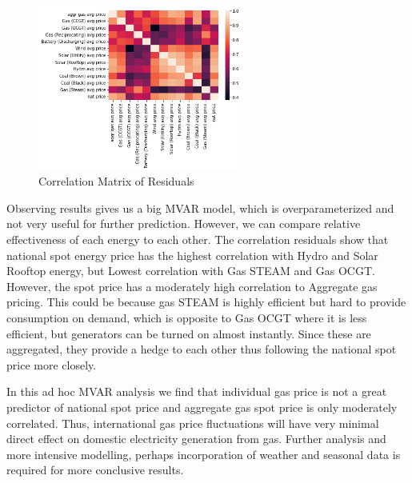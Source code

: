 \begin{figure}[H]
    \centering
    \includegraphics[width=0.6\textwidth]{Figures/NEM-Analysis/correl_var.png}
    \caption{Correlation Matrix of Residuals}
    \label{fig:NEM-correl}
\end{figure}

Observing results gives us a big MVAR model, which is overparameterized and not very useful for further prediction. However, we can compare relative effectiveness of each energy to each other. The correlation residuals show that national spot energy price has the highest correlation with Hydro and Solar Rooftop energy, but Lowest correlation with Gas STEAM and Gas OCGT. However, the spot price has a moderately high correlation to Aggregate gas pricing. This could be because gas STEAM is highly efficient but hard to provide consumption on demand, which is opposite to Gas OCGT where it is less efficient, but generators can be turned on almost instantly. Since these are aggregated, they provide a hedge to each other thus following the national spot price more closely.
\medskip

In this ad hoc MVAR analysis we find that individual gas price is not a great predictor of national spot price and aggregate gas spot price is only moderately correlated. Thus, international gas price fluctuations will have very minimal direct effect on domestic electricity generation from gas. Further analysis and more intensive modelling, perhaps incorporation of weather and seasonal data is required for more conclusive results.